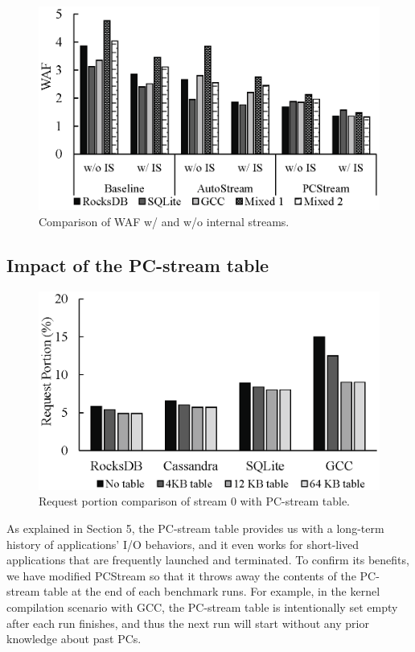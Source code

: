 \begin{figure}[t]
	\centering
	\includegraphics[width=0.9\linewidth]{figure/internal}
	\caption{Comparison of WAF w/ and w/o internal streams.}
	\label{fig:internal}
\end{figure}


\subsection{Impact of the PC-stream table}

\begin{figure}[t]
	\centering
	\includegraphics[width=0.7\linewidth]{figure/pctable}
	\caption{Request portion comparison of stream 0 with PC-stream table.}
	\label{fig:pctable}
\end{figure}

As explained in Section 5, the PC-stream table provides us with a long-term
history of applications' I/O behaviors, and it even works for short-lived
applications that are frequently launched and terminated. To confirm its
benefits, we have modified \textsf{PCStream} so that it throws away the
contents of the PC-stream table at the end of each benchmark runs. For example,
in the kernel compilation scenario with GCC, the PC-stream table is
intentionally set empty after each run finishes, and thus the next run will
start without any prior knowledge about past PCs.

